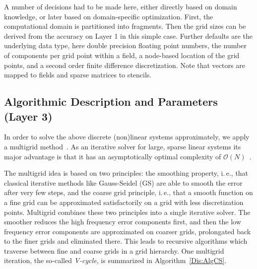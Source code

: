 \documentclass[onecolumn]{svjour3}
\begin{document}
A number of decisions had to be made here, either directly based on domain knowledge, or later based on domain-specific optimization. First, the computational domain is partitioned into fragments.   
Then the grid sizes can be derived from the accuracy on Layer 1 in this simple case. Further defaults are the underlying data type, here double precision floating point numbers, the number of components per grid point within a field, a node-based location of the grid points, and a second order finite difference discretization. Note that vectors are mapped to fields and sparse matrices to stencils.

\subsection{Algorithmic Description and Parameters (Layer 3)}
\label{sec:MG}

In order to solve the above discrete (non)linear systems approximately, we apply a multigrid method~\cite{Brandt77,Hackbusch85}.
As an iterative solver for large, sparse linear systems its major advantage 
is that it has an asymptotically optimal complexity of $\mathcal{O}(N)$~\cite{Briggshenson00,Trottenbergoosterlee01,Griebel99}.

The multigrid idea is based on two principles:
the smoothing property, i.\,e., that classical iterative methods like Gauss-Seidel (GS) are able 
to smooth the error after very few steps, and the coarse grid principle, 
i.\,e., that a smooth function on a fine grid can be approximated satisfactorily on a grid with 
less discretization points.
Multigrid combines these two principles into a single iterative solver.
The smoother reduces the high frequency error components first, and then the low
frequency error components are approximated on coarser grids, prolongated
back to the finer grids and eliminated there.
This leads to recursive algorithms which traverse between fine and coarse grids in a grid
hierarchy. 
One multigrid iteration, the so-called \textit{V-cycle}, is summarized in 
Algorithm~\ref{Dis:AlgCS}. 
\end{document}
